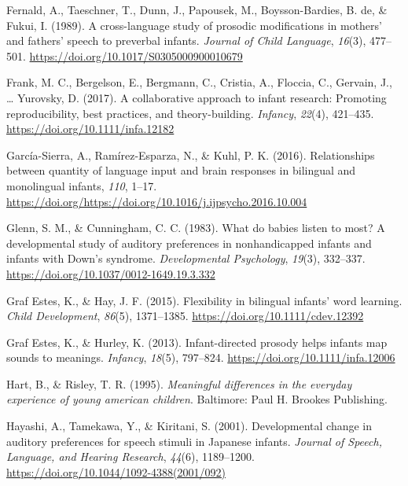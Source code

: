 \documentclass[
  english,
  ,man,floatsintext]{apa6}
\begin{document}
\leavevmode\hypertarget{ref-fernald_1989}{}%
Fernald, A., Taeschner, T., Dunn, J., Papousek, M., Boysson-Bardies, B. de, \& Fukui, I. (1989). A cross-language study of prosodic modifications in mothers' and fathers' speech to preverbal infants. \emph{Journal of Child Language}, \emph{16}(3), 477--501. \url{https://doi.org/10.1017/S0305000900010679}

\leavevmode\hypertarget{ref-frank_2017}{}%
Frank, M. C., Bergelson, E., Bergmann, C., Cristia, A., Floccia, C., Gervain, J., \ldots{} Yurovsky, D. (2017). A collaborative approach to infant research: Promoting reproducibility, best practices, and theory-building. \emph{Infancy}, \emph{22}(4), 421--435. \url{https://doi.org/10.1111/infa.12182}

\leavevmode\hypertarget{ref-garcia_sierra_2016}{}%
García-Sierra, A., Ramírez-Esparza, N., \& Kuhl, P. K. (2016). Relationships between quantity of language input and brain responses in bilingual and monolingual infants, \emph{110}, 1--17. \url{https://doi.org/https://doi.org/10.1016/j.ijpsycho.2016.10.004}

\leavevmode\hypertarget{ref-glenn_1983}{}%
Glenn, S. M., \& Cunningham, C. C. (1983). What do babies listen to most? A developmental study of auditory preferences in nonhandicapped infants and infants with Down's syndrome. \emph{Developmental Psychology}, \emph{19}(3), 332--337. \url{https://doi.org/10.1037/0012-1649.19.3.332}

\leavevmode\hypertarget{ref-graf_estes_2015}{}%
Graf Estes, K., \& Hay, J. F. (2015). Flexibility in bilingual infants' word learning. \emph{Child Development}, \emph{86}(5), 1371--1385. \url{https://doi.org/10.1111/cdev.12392}

\leavevmode\hypertarget{ref-graf_estes_2013}{}%
Graf Estes, K., \& Hurley, K. (2013). Infant-directed prosody helps infants map sounds to meanings. \emph{Infancy}, \emph{18}(5), 797--824. \url{https://doi.org/10.1111/infa.12006}

\leavevmode\hypertarget{ref-hart_1995}{}%
Hart, B., \& Risley, T. R. (1995). \emph{Meaningful differences in the everyday experience of young american children}. Baltimore: Paul H. Brookes Publishing.

\leavevmode\hypertarget{ref-hayashi_2001}{}%
Hayashi, A., Tamekawa, Y., \& Kiritani, S. (2001). Developmental change in auditory preferences for speech stimuli in Japanese infants. \emph{Journal of Speech, Language, and Hearing Research}, \emph{44}(6), 1189--1200. \url{https://doi.org/10.1044/1092-4388(2001/092)}
\end{document}
